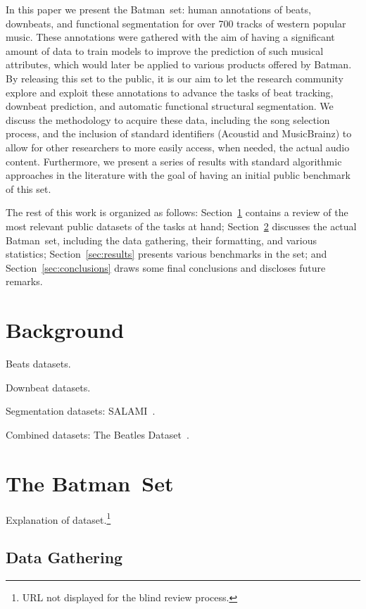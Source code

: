 \documentclass{article}
\newcommand{\setName}{Batman}
\begin{document}
In this paper we present the \setName~set: human annotations of beats, downbeats, and functional segmentation for over 700 tracks of western popular music.
These annotations were gathered with the aim of having a significant amount of data to train models to improve the prediction of such musical attributes, which would later be applied to various products offered by \setName.
By releasing this set to the public, it is our aim to let the research community explore and exploit these annotations to advance the tasks of beat tracking, downbeat prediction, and automatic functional structural segmentation.
We discuss the methodology to acquire these data, including the song selection process, and the inclusion of standard identifiers (Acoustid and MusicBrainz) to allow for other researchers to more easily access, when needed, the actual audio content.
Furthermore, we present a series of results with standard algorithmic approaches in the literature with the goal of having an initial public benchmark of this set.

The rest of this work is organized as follows: Section~\ref{sec:background} contains a review of the most relevant public datasets of the tasks at hand; Section~\ref{sec:dataset} discusses the actual \setName~set, including the data gathering, their formatting, and various statistics; Section~\ref{sec:results} presents various benchmarks in the set; and Section~\ref{sec:conclusions} draws some final conclusions and discloses future remarks.
%
\section{Background}\label{sec:background}

Beats datasets.

Downbeat datasets.

Segmentation datasets: SALAMI~\cite{Smith2011}.

Combined datasets: The Beatles Dataset~\cite{Mauch2009a}.

\section{The \setName~Set}\label{sec:dataset}

Explanation of dataset.\footnote{URL not displayed for the blind review process.}

\subsection{Data Gathering}
\end{document}
